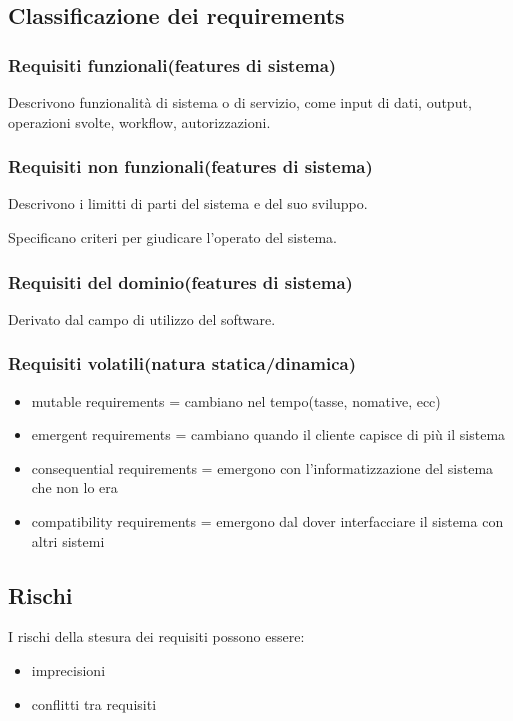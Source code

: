 \documentclass{article}
\begin{document}
\subsection{Classificazione dei requirements}
\subsubsection{Requisiti funzionali(features di sistema)}
Descrivono funzionalità di sistema o di servizio, come input di dati, output, 
operazioni svolte, workflow, autorizzazioni.

\subsubsection{Requisiti non funzionali(features di sistema)}

Descrivono i limitti di parti del sistema e del suo sviluppo.

Specificano criteri per giudicare l'operato del sistema.

\subsubsection{Requisiti del dominio(features di sistema)}
Derivato dal campo di utilizzo del software.

\subsubsection{Requisiti volatili(natura statica/dinamica)}
\begin{itemize}
    \item mutable requirements = cambiano nel tempo(tasse, nomative, ecc)
    \item emergent requirements = cambiano quando il cliente capisce di più il sistema
    \item consequential requirements = emergono con l'informatizzazione del sistema che non lo era
    \item compatibility requirements = emergono dal dover interfacciare il sistema con altri sistemi 
\end{itemize}

\subsection{Rischi}
I rischi della stesura dei requisiti possono essere:
\begin{itemize}
    \item imprecisioni
    \item conflitti tra requisiti
\end{itemize}
\end{document}

